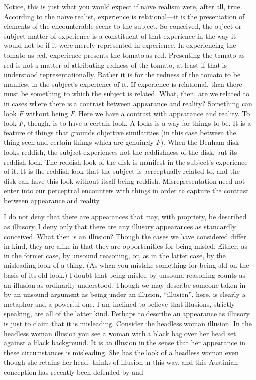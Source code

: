 \documentclass[12pt]{article}
\begin{document}
Notice, this is just what you would expect if naïve realism were, after all, true. According to the naïve realist, experience is relational---it is the presentation of elements of the encounterable scene to the subject. So conceived, the object or subject matter of experience is a constituent of that experience in the way it would not be if it were merely represented in experience. In experiencing the tomato as red, experience presents the tomato as red. Presenting the tomato as red is not a matter of attributing redness of the tomato, at least if that is understood representationally. Rather it is for the redness of the tomato to be manifest in the subject's experience of it. If experience is relational, then there must be something to which the subject is related. What, then, are we related to in cases where there is a contrast between appearance and reality? Something can look \( F \) without being \( F \). Here we have a contrast with appearance and reality. To look \( F \), though, is to have a certain look. A looks is a way for things to be. It is a feature of things that grounds objective similarities (in this case between the thing seen and certain things which are genuinely \( F \)). When the Benham disk looks reddish, the subject experiences not the reddishness of the disk, but its reddish look. The reddish look of the disk is manifest in the subject's experience of it. It is the reddish look that the subject is perceptually related to, and the disk can have this look without itself being reddish. Misrepresentation need not enter into our perceptual encounters with things in order to capture the contrast between appearance and reality.

I do not deny that there are appearances that may, with propriety, be described as illusory. I deny only that there are any illusory appearances as standardly conceived. What then is an illusion? Though the cases we have considered differ in kind, they are alike in that they are opportunities for being misled. Either, as in the former case, by unsound reasoning, or, as in the latter case, by the misleading look of a thing. (As when you mistake something for being old on the basis of its old look.) I doubt that being misled by unsound reasoning counts as an illusion as ordinarily understood. Though we may describe someone taken in by an unsound argument as being under an illusion, ``illusion'', here, is clearly a metaphor and a powerful one. I am inclined to believe that illusions, strictly speaking, are all of the latter kind. Perhaps to describe an appearance as illusory is just to claim that it is misleading. Consider the headless woman illusion. In the headless woman illusion you see a woman with a black bag over her head set against a black background. It is an illusion in the sense that her appearance in these circumstances is misleading. She has the look of a headless woman even though she retains her head. \citet{Austin:1962lr} thinks of illusion in this way, and this Austinian conception has recently been defended by \citep[68]{Travis:2004kx} and \citet{Brewer:2008fv}.
\end{document}
